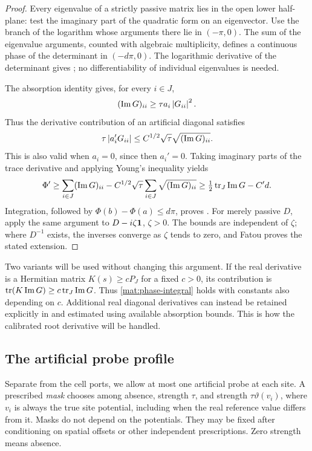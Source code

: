 \begin{proof}
Every eigenvalue of a strictly passive matrix lies in the open lower
half-plane: test the imaginary part of the quadratic form on an
eigenvector. Use the branch of the logarithm whose arguments there lie
in $(-\pi,0)$. The sum of the eigenvalue arguments, counted with
algebraic multiplicity, defines a continuous phase of the determinant
in $(-d\pi,0)$. The logarithmic derivative of the determinant gives
; no differentiability of individual
eigenvalues is needed.

The absorption identity gives, for every $i\in J$,
\[
 (\operatorname{Im}G)_{ii}\ge\tau a_i\left\lvert G_{ii}\right\rvert^2.
\]
Thus the derivative contribution of an artificial diagonal satisfies
\[
 \tau\left\lvert a_i'G_{ii}\right\rvert
       \le C^{1/2}\sqrt\tau\sqrt{(\operatorname{Im}G)_{ii}}.
\]
This is also valid when $a_i=0$, since then $a_i'=0$. Taking imaginary
parts of the trace derivative and applying Young's inequality yields
\[
 \Phi'
 \ge\sum_{i\in J}(\operatorname{Im}G)_{ii}
       -C^{1/2}\sqrt\tau\sum_{i\in J}
                       \sqrt{(\operatorname{Im}G)_{ii}}
 \ge\tfrac12\operatorname{tr}_J\operatorname{Im}G-C'd.
\]
Integration, followed by $\Phi(b)-\Phi(a)\le d\pi$, proves
. For merely passive $D$, apply the same
argument to $D-i\zeta\mathbf 1$, $\zeta>0$. The bounds are independent of
$\zeta$; where $D^{-1}$ exists, the inverses converge as $\zeta$ tends
to zero, and Fatou proves the stated extension.
\end{proof}

Two variants will be used without changing this argument. If the real
derivative is a Hermitian matrix $K(s)\ge cP_J$ for a fixed $c>0$, its
contribution is $\operatorname{tr}(K\operatorname{Im}G)\ge c\operatorname{tr}_J\operatorname{Im}G$.
Thus \cref{mat:phase-integral} holds with constants also depending on
$c$. Additional real diagonal derivatives can instead be retained explicitly
in  and estimated using available absorption
bounds. This is how the calibrated root derivative will be handled.

\subsection{The artificial probe profile}
\label{mat:probes}

Separate from the cell ports, we allow at most one artificial probe at
each site. A prescribed \emph{mask} chooses among absence, strength
$\tau$, and strength $\tau\vartheta(v_i)$, where $v_i$ is always the
true site potential, including when the real reference value differs
from it. Masks do not depend on the potentials. They may be fixed after
conditioning on spatial offsets or other independent prescriptions.
Zero strength means absence.

